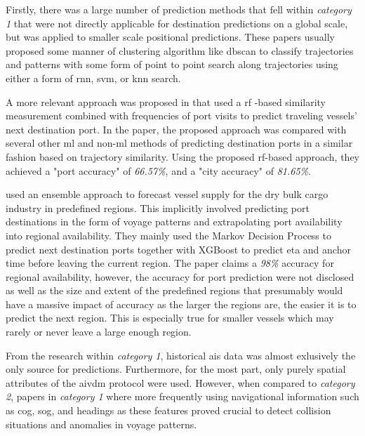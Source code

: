
Firstly, there was a large number of prediction methods that fell within \textit{category 1} that were not directly applicable for destination predictions on a global scale, but was applied to smaller scale positional predictions. These papers usually proposed some manner of clustering algorithm like \acrshort{dbscan} to classify trajectories and patterns with some form of point to point search along trajectories using either a form of \acrfull{rnn}, \acrfull{svm}, or \acrfull{knn} search.

A more relevant approach was proposed in \cite{Zhang2020AISApproach} that used a \acrfull{rf} -based similarity measurement combined with frequencies of port visits to predict traveling vessels' next destination port. In the paper, the proposed approach was compared with several other \acrshort{ml} and non-\acrshort{ml} methods of predicting destination ports in a similar fashion based on trajectory similarity. Using the proposed \acrshort{rf}-based approach, they achieved a "port accuracy" of \textit{66.57\%}, and a "city accuracy" of \textit{81.65\%}.

\cite{lechtenberg2019} used an ensemble approach to forecast vessel supply for the dry bulk cargo industry in predefined regions. This implicitly involved predicting port destinations in the form of voyage patterns and extrapolating port availability into regional availability. They mainly used the Markov Decision Process to predict next destination ports together with XGBoost to predict \acrshort{eta} and anchor time before leaving the current region. The paper claims a \textit{98\%} accuracy for regional availability, however, the accuracy for port prediction were not disclosed as well as the size and extent of the predefined regions that presumably would have a massive impact of accuracy as the larger the regions are, the easier it is to predict the next region. This is especially true for smaller vessels which may rarely or never leave a large enough region.



From the research within \textit{category 1}, historical \acrshort{ais} data was almost exlusively the only source for predictions. Furthermore, for the most part, only purely spatial attributes of the \gls{aivdm} protocol were used. However, when compared to \textit{category 2}, papers in \textit{category 1} where more frequently using navigational information such as \acrshort{cog}, \acrshort{sog}, and headings as these features proved crucial to detect collision situations and anomalies in voyage patterns.

